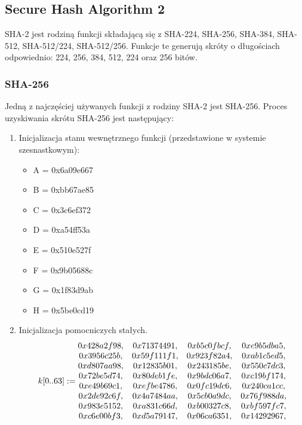 \subsection{Secure Hash Algorithm 2}
SHA-2 jest rodziną funkcji składającą się z \mbox{SHA-224}, \mbox{SHA-256}, \mbox{SHA-384}, \mbox{SHA-512}, \mbox{SHA-512/224}, \mbox{SHA-512/256}. Funkcje te generują skróty o długościach odpowiednio: 224, 256, 384, 512, 224 oraz 256 bitów.

\subsubsection{SHA-256}
Jedną z najczęściej używanych funkcji z rodziny SHA-2 jest SHA-256. Proces uzyskiwania skrótu SHA-256 jest następujący:
\begin{enumerate}
	\item Inicjalizacja stanu wewnętrznego funkcji (przedstawione w systemie szesnastkowym):
		\begin{itemize}
			\item A = 0x6a09e667
			\item B = 0xbb67ae85
			\item C = 0x3c6ef372
			\item D = 0xa54ff53a
			\item E = 0x510e527f
			\item F = 0x9b05688c
			\item G = 0x1f83d9ab
			\item H = 0x5be0cd19
		\end{itemize}
	\item Inicjalizacja pomocniczych stałych. \\
			$$
			k[0..63] := \\
			\begin{matrix}
				0x428a2f98, & 0x71374491, & 0xb5c0fbcf, & 0xe9b5dba5, \\
				0x3956c25b, & 0x59f111f1, & 0x923f82a4, & 0xab1c5ed5, \\
				0xd807aa98, & 0x12835b01, & 0x243185be, & 0x550c7dc3, \\
				0x72be5d74, & 0x80deb1fe, & 0x9bdc06a7, & 0xc19bf174, \\
				0xe49b69c1, & 0xefbe4786, & 0x0fc19dc6, & 0x240ca1cc, \\
				0x2de92c6f, & 0x4a7484aa, & 0x5cb0a9dc, & 0x76f988da, \\
				0x983e5152, & 0xa831c66d, & 0xb00327c8, & 0xbf597fc7, \\
				0xc6e00bf3, & 0xd5a79147, & 0x06ca6351, & 0x14292967, \\

\end{matrix}$$
\end{enumerate}

